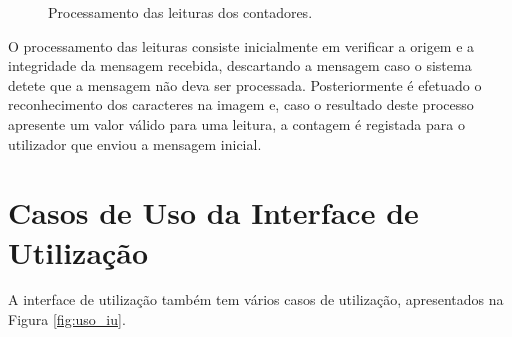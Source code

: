 \begin{figure}[h!]
\begin{center}
\caption{Processamento das leituras dos contadores.}
\label{fig:state_processamento}
\end{center}
\end{figure}

O processamento das leituras consiste inicialmente em verificar a origem e a integridade da mensagem recebida, descartando a mensagem caso o sistema detete que a mensagem não deva ser processada. Posteriormente é efetuado o reconhecimento dos caracteres na imagem e, caso o resultado deste processo apresente um valor válido para uma leitura, a contagem é registada para o utilizador que enviou a mensagem inicial.

\section{Casos de Uso da Interface de Utilização} \label{sec:casos_iu}
A interface de utilização também tem vários casos de utilização, apresentados na Figura \ref{fig:uso_iu}.

